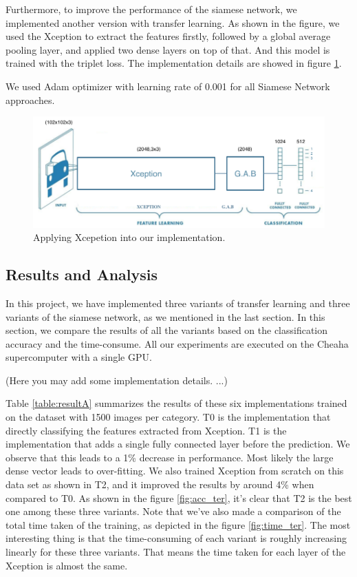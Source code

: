 Furthermore, to improve the performance of the siamese network, we implemented another version with transfer learning. As shown in the figure, we used the Xception to extract the features firstly, followed by a global average pooling layer, and applied two dense layers on top of that. And this model is trained with the triplet loss. The implementation details are showed in figure \ref{fig:xception_cnn}. 

We used Adam optimizer with learning rate of 0.001 for all Siamese Network approaches. 

\begin{figure}[h]
  \centering
  \includegraphics[width=\linewidth]{figs/xception_cnn.png}
  \caption{Applying  Xcepetion into our implementation.}
  \label{fig:xception_cnn}
\end{figure}

\subsection{Results and Analysis}
In this project, we have implemented three variants of transfer learning and three variants of the siamese network, as we mentioned in the last section. In this section, we compare the results of all the variants based on the classification accuracy and the time-consume. All our experiments are executed on the Cheaha supercomputer with a single GPU. 

(Here you may add some implementation details.  ...)

Table \ref{table:resultA}  summarizes the results of these six implementations trained on the dataset with 1500 images per category. T0 is the implementation that directly classifying the features extracted from Xception. T1 is the implementation that adds a single fully connected layer before the prediction. We observe that this leads to a 1\% decrease in performance. Most likely the large dense vector leads to over-fitting. We also trained Xception from scratch on this data set as shown in T2, and it improved the results by around 4\% when compared to T0. As shown in the figure \ref{fig:acc_ter}, it's clear that T2 is the best one among these three variants. Note that we've also made a comparison of the total time taken of the training, as depicted in the figure \ref{fig:time_ter}. The most interesting thing is that the time-consuming of each variant is roughly increasing linearly for these three variants. That means the time taken for each layer of the Xception is almost the same. 

